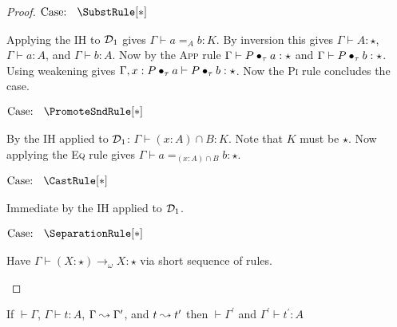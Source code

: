 \begin{proof}
    $\text{Case: }\begin{array}{c} \SubstRule[*] \end{array}$
    \begin{proofcase}
        Applying the IH to $\mathcal{D}_{1}$ gives $\Gamma \vdash a =_A b : K$.
        By inversion this gives $\Gamma \vdash A : \star$, $\Gamma \vdash a : A$, and $\Gamma \vdash b : A$.
        Now by the \textsc{App} rule $\Gamma \vdash P \bullet_{\tau} a : \star$ and $\Gamma \vdash P \bullet_{\tau} b : \star$.
        Using weakening gives $\Gamma, x : P \bullet_{\tau} a \vdash P \bullet_{\tau} b : \star$.
        Now the \textsc{Pi} rule concludes the case.
    \end{proofcase}

    $\text{Case: }\begin{array}{c} \PromoteSndRule[*] \end{array}$
    \begin{proofcase}
        By the IH applied to $\mathcal{D}_{1}$: $\Gamma \vdash (x : A) \cap B : K$.
        Note that $K$ must be $\star$.
        Now applying the \textsc{Eq} rule gives $\Gamma \vdash a =_{(x : A) \cap B} b : \star$.
    \end{proofcase}

    $\text{Case: }\begin{array}{c} \CastRule[*] \end{array}$
    \begin{proofcase}
        Immediate by the IH applied to $\mathcal{D}_{1}$.
    \end{proofcase}

    $\text{Case: }\begin{array}{c} \SeparationRule[*] \end{array}$
    \begin{proofcase}
        Have $\Gamma \vdash (X : \star) \to_\omega X : \star$ via short sequence of rules.
    \end{proofcase}
\end{proof}

\begin{lemma}
    If $\vdash \Gamma$, $\Gamma \vdash t : A$, $\Gamma \leadsto \Gamma^\prime$, and $t \leadsto t^\prime$ then $\vdash \Gamma^\prime$ and $\Gamma^\prime \vdash t^\prime : A$
\end{lemma}
